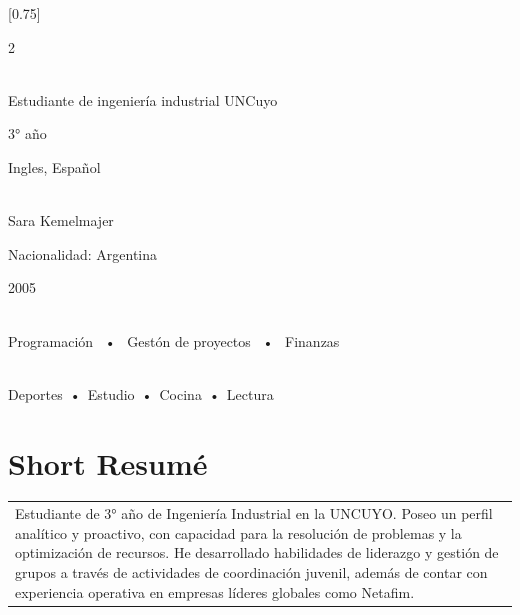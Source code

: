 \documentclass[lighthipster]{simplehipstercv}
\begin{document}
\setlength{\columnsep}{1.5cm}
[0.75]
\begin{paracol}{2}

\paracolbackgroundoptions



\footnotesize
{\setasidefontcolour
\flushright
\begin{center}
\end{center}

\\[0.5em]
Estudiante de ingeniería industrial UNCuyo

3° año

Ingles, Español


 \\[0.5em]
Sara Kemelmajer

Nacionalidad: Argentina 

2005

\bigskip

 \\[0.5em]

Programación ~•~ Gestón de proyectos ~•~ Finanzas

\bigskip



\bigskip

\\[0.5em]

Deportes~•~Estudio~•~Cocina~•~Lectura
\bigskip




\phantom{turn the page}

\phantom{turn the page}
}
\switchcolumn

\small
\section*{Short Resumé}

\begin{tabular}{ p{}}
    {Estudiante de 3° año de Ingeniería Industrial en la UNCUYO. Poseo un perfil analítico y proactivo, con capacidad para la resolución de problemas y la optimización de recursos. He desarrollado habilidades de liderazgo y gestión de grupos a través de actividades de coordinación juvenil, además de contar con experiencia operativa en empresas líderes globales como Netafim.} \\ 


\end{tabular}
\end{paracol}
\end{document}

